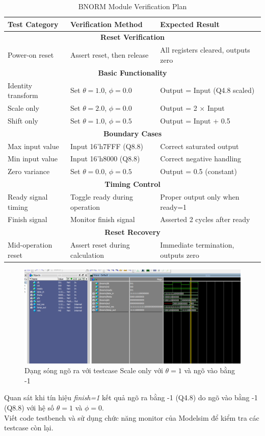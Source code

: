 \begin{table}[h]
\centering
\caption{BNORM Module Verification Plan}
\label{tab:bnorm_verification}
\begin{tabular}{|l|l|l|}
\hline
\textbf{Test Category} & \textbf{Verification Method} & \textbf{Expected Result} \\ \hline
\multicolumn{3}{|c|}{\textbf{Reset Verification}} \\ \hline
Power-on reset & Assert reset, then release & All registers cleared, outputs zero \\ \hline
\multicolumn{3}{|c|}{\textbf{Basic Functionality}} \\ \hline
Identity transform & Set $\theta=1.0$, $\phi=0.0$ & Output = Input (Q4.8 scaled) \\ \hline
Scale only & Set $\theta=2.0$, $\phi=0.0$ & Output = 2 $\times$ Input \\ \hline
Shift only & Set $\theta=1.0$, $\phi=0.5$ & Output = Input + 0.5 \\ \hline
\multicolumn{3}{|c|}{\textbf{Boundary Cases}} \\ \hline
Max input value & Input 16'h7FFF (Q8.8) & Correct saturated output \\ \hline
Min input value & Input 16'h8000 (Q8.8) & Correct negative handling \\ \hline
Zero variance & Set $\theta=0.0$, $\phi=0.5$ & Output = 0.5 (constant) \\ \hline
\multicolumn{3}{|c|}{\textbf{Timing Control}} \\ \hline
Ready signal timing & Toggle ready during operation & Proper output only when ready=1 \\ \hline
Finish signal & Monitor finish signal & Asserted 2 cycles after ready \\ \hline
\multicolumn{3}{|c|}{\textbf{Reset Recovery}} \\ \hline
Mid-operation reset & Assert reset during calculation & Immediate termination, outputs zero \\ \hline
\end{tabular}
\end{table}

\begin{figure}[H]
    \centering
    \includegraphics[width=0.75\linewidth]{Images/bnormtest.png}
    \caption{Dạng sóng ngõ ra với testcase Scale only với $\theta=1$ và ngõ vào bằng -1}
    \label{fig:enter-label}
\end{figure}
Quan sát khi tín hiệu \textit{finish=1} kết quả ngõ ra bằng -1 (Q4.8) do ngõ vào bằng -1 (Q8.8) với hệ số $\theta=1$ và $\phi=0$. \\
Viết code testbench và sử dụng chức năng monitor của Modelsim để kiểm tra các testcase
còn lại.

